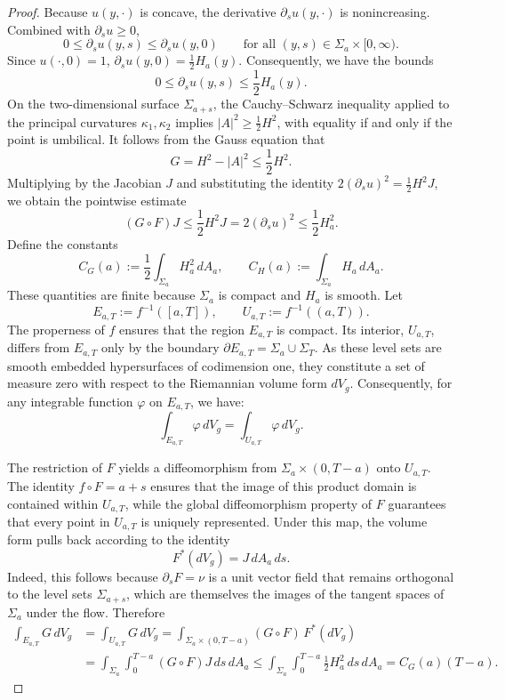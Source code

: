 \documentclass[12pt,oneside,a4paper]{article}
\theoremstyle{mytheorem}
\theoremstyle{remark}
\begin{document}
\begin{proof}
Because $u(y,\cdot)$ is concave, the derivative $\partial_su(y,\cdot)$ is nonincreasing. Combined with $\partial_su\ge 0$,
\[
0\le\partial_su(y,s)\le\partial_su(y,0)\qquad\text{for all }(y,s)\in\Sigma_a\times[0,\infty).
\]
Since $u(\cdot,0)=1$, $\partial_su(y,0)=\frac12H_a(y).$
Consequently, we have the bounds$$0 \le \partial_s u(y,s) \le \frac{1}{2} H_a(y).$$On the two-dimensional surface $\Sigma_{a+s}$, the Cauchy–Schwarz inequality applied to the principal curvatures $\kappa_1, \kappa_2$ implies $|A|^2 \ge \frac{1}{2} H^2$, with equality if and only if the point is umbilical. It follows from the Gauss equation that$$G = H^2 - |A|^2 \le \frac{1}{2} H^2.$$Multiplying by the Jacobian $J$ and substituting the identity $2(\partial_s u)^2 = \frac{1}{2} H^2 J$, we obtain the pointwise estimate$$(G \circ F) J \le \frac{1}{2} H^2 J = 2 (\partial_s u)^2 \le \frac{1}{2} H_a^2.$$
Define the constants
\[
C_G(a):=\frac12\int_{\Sigma_a} H_a^2\, dA_a,
\qquad
C_H(a):=\int_{\Sigma_a} H_a\, dA_a.
\]
These quantities are finite because $\Sigma_a$ is compact and $H_a$ is smooth.
Let
\[
E_{a,T}:=f^{-1}([a,T]),\qquad U_{a,T}:=f^{-1}((a,T)).
\]
The properness of $f$ ensures that the region $E_{a,T}$ is compact. Its interior, $U_{a,T}$, differs from $E_{a,T}$ only by the boundary $\partial E_{a,T} = \Sigma_a \cup \Sigma_T$. As these level sets are smooth embedded hypersurfaces of codimension one, they constitute a set of measure zero with respect to the Riemannian volume form $dV_g$. Consequently, for any integrable function $\varphi$ on $E_{a,T}$, we have:$$\int_{E_{a,T}} \varphi \, dV_g = \int_{U_{a,T}} \varphi \, dV_g.
$$

The restriction of $F$ yields a diffeomorphism from $\Sigma_a \times (0, T-a)$ onto $U_{a,T}$. The identity $f \circ F = a + s$ ensures that the image of this product domain is contained within $U_{a,T}$, while the global diffeomorphism property of $F$ guarantees that every point in $U_{a,T}$ is uniquely represented. Under this map, the volume form pulls back according to the identity$$F^*(dV_g) = J \, dA_a \, ds.$$ Indeed, this follows because $\partial_s F = \nu$ is a unit vector field that remains orthogonal to the level sets $\Sigma_{a+s}$, which are themselves the images of the tangent spaces of $\Sigma_a$ under the flow. Therefore
\begin{equation}\label{G}
\begin{aligned}
\int_{E_{a,T}} G\,dV_g
&= \int_{U_{a,T}} G\, dV_g
= \int_{\Sigma_a \times (0, T-a)} (G \circ F)\, F^*(dV_g)  \\
&= \int_{\Sigma_a}\int_0^{T-a} (G \circ F)J\,ds\,dA_a
\le \int_{\Sigma_a}\int_0^{T-a}\tfrac12 H_a^2\,ds\,dA_a
= C_G(a)(T-a).
\end{aligned}
\end{equation}


\end{proof}
\end{document}
